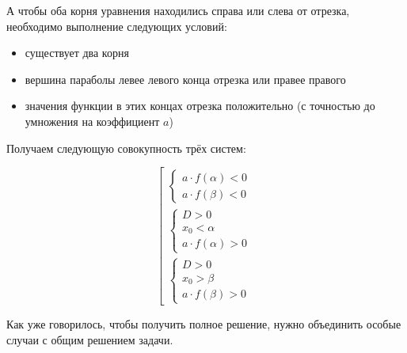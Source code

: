 А чтобы оба корня уравнения находились справа или слева от отрезка, необходимо выполнение следующих
условий:

\begin {itemize}
    \item {существует два корня}
    \item {вершина параболы левее левого конца отрезка или правее правого}
    \item {значения функции в этих концах отрезка положительно (с точностью до умножения на
           коэффициент $a$) }
\end {itemize}

Получаем следующую совокупность трёх систем:

\begin {equation*}
    \left[
        \begin {gathered}
            \begin {cases}
                a \cdot f(\alpha) < 0
                \\
                a \cdot f(\beta) < 0
            \end {cases}
            \\
            \begin {cases}
                D > 0
                \\
                x_0 < \alpha
                \\
                a \cdot f(\alpha) > 0
            \end {cases}
            \\
            \begin {cases}
                D > 0
                \\
                x_0 > \beta
                \\
                a \cdot f(\beta) > 0
            \end {cases}
        \end {gathered}
    \right.
\end {equation*}

Как уже говорилось, чтобы получить полное решение, нужно объединить особые случаи с общим решением
задачи.